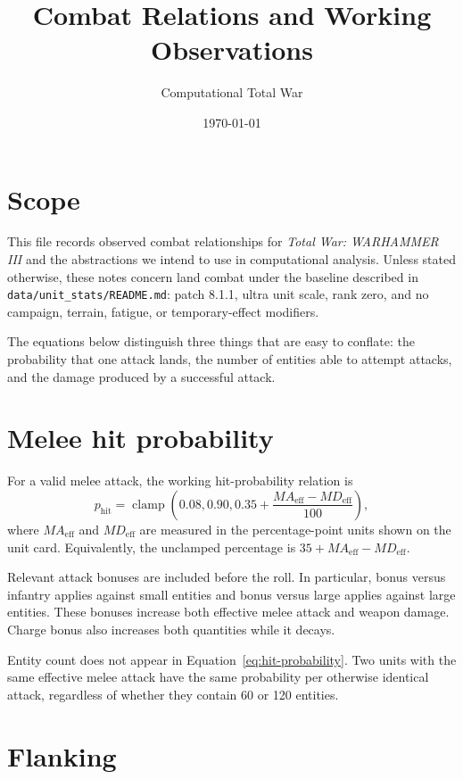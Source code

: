 \documentclass[11pt]{article}
\title{Combat Relations and Working Observations}
\author{Computational Total War}
\date{\today}
\begin{document}
\maketitle

\section{Scope}

This file records observed combat relationships for \emph{Total War:
WARHAMMER III} and the abstractions we intend to use in computational
analysis.  Unless stated otherwise, these notes concern land combat under the
baseline described in \texttt{data/unit\_stats/README.md}: patch 8.1.1, ultra
unit scale, rank zero, and no campaign, terrain, fatigue, or temporary-effect
modifiers.

The equations below distinguish three things that are easy to conflate:
the probability that one attack lands, the number of entities able to attempt
attacks, and the damage produced by a successful attack.

\section{Melee hit probability}

For a valid melee attack, the working hit-probability relation is
\begin{equation}
  p_{\mathrm{hit}}
  = \operatorname{clamp}\!\left(
      0.08,
      0.90,
      0.35 + \frac{MA_{\mathrm{eff}}-MD_{\mathrm{eff}}}{100}
    \right),
  \label{eq:hit-probability}
\end{equation}
where $MA_{\mathrm{eff}}$ and $MD_{\mathrm{eff}}$ are measured in the
percentage-point units shown on the unit card.  Equivalently, the unclamped
percentage is $35 + MA_{\mathrm{eff}}-MD_{\mathrm{eff}}$.

Relevant attack bonuses are included before the roll.  In particular, bonus
versus infantry applies against small entities and bonus versus large applies
against large entities.  These bonuses increase both effective melee attack
and weapon damage.  Charge bonus also increases both quantities while it
decays.

Entity count does not appear in Equation~\ref{eq:hit-probability}.  Two units
with the same effective melee attack have the same probability per otherwise
identical attack, regardless of whether they contain 60 or 120 entities.

\section{Flanking}
\end{document}
